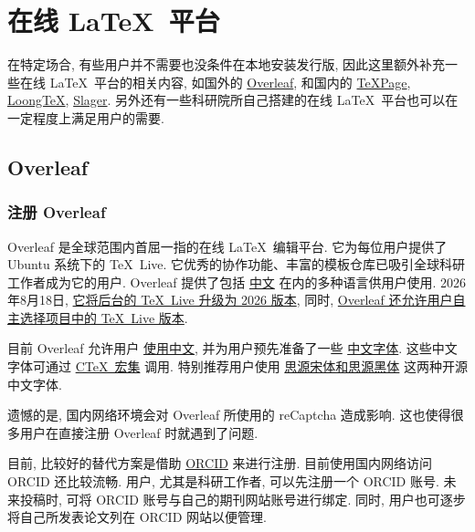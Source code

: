 
\chapter{在线 \LaTeX\ 平台}

在特定场合,
有些用户并不需要也没条件在本地安装发行版,
因此这里额外补充一些在线 \LaTeX\ 平台的相关内容,
如国外的 \href{https://www.overleaf.com/}{Overleaf},
和国内的 \href{https://www.texpage.com/}{TeXPage},
\href{https://www.loongtex.com/}{LoongTeX},
\href{https://www.slager.link/#/Home}{Slager}.
另外还有一些科研院所自己搭建的在线 \LaTeX\ 平台也可以在一定程度上满足用户的需要.

\section{Overleaf}

\subsection{注册 Overleaf}

Overleaf 是全球范围内首屈一指的在线 \LaTeX\ 编辑平台.
它为每位用户提供了 Ubuntu 系统下的 \TeX~Live.
它优秀的协作功能、丰富的模板仓库已吸引全球科研工作者成为它的用户.
Overleaf 提供了包括%
\href{https://cn.overleaf.com/}{中文}%
在内的多种语言供用户使用.
2026年8月18日,
\href{https://www.overleaf.com/blog/tex-live-2026-is-now-available}{它将后台的 \TeX~Live 升级为 2026 版本},
同时,
\href{https://www.overleaf.com/blog/new-feature-select-your-tex-live-compiler-version}{Overleaf 还允许用户自主选择项目中的 \TeX~Live 版本}.

目前 Overleaf 允许用户%
\href{https://www.overleaf.com/learn/latex/Chinese}{使用中文},
并为用户预先准备了一些%
\href{https://www.overleaf.com/learn/latex/Questions/Which_OTF_or_TTF_fonts_are_supported_via_fontspec%3F#Fonts_for_CJK}{中文字体}.
这些中文字体可通过%
\href{https://www.overleaf.com/latex/templates/using-the-ctex-package-on-overleaf-zai-overleafping-tai-shang-shi-yong-ctex/gndvpvsmjcqx}{C\TeX\ 宏集}%
调用.
特别推荐用户使用%
\href{https://www.overleaf.com/latex/examples/demonstration-of-noto-serif-cjk-and-noto-sans-cjk-fonts/sgrwgcddtqsq}{思源宋体和思源黑体}%
这两种开源中文字体.

遗憾的是,
国内网络环境会对 Overleaf 所使用的 reCaptcha 造成影响.
这也使得很多用户在直接注册 Overleaf 时就遇到了问题.

目前,
比较好的替代方案是借助 \href{https://orcid.org/}{ORCID} 来进行注册.
目前使用国内网络访问 ORCID 还比较流畅.
用户, 尤其是科研工作者, 可以先注册一个 ORCID 账号.
未来投稿时,
可将 ORCID 账号与自己的期刊网站账号进行绑定.
同时,
用户也可逐步将自己所发表论文列在 ORCID 网站以便管理.

